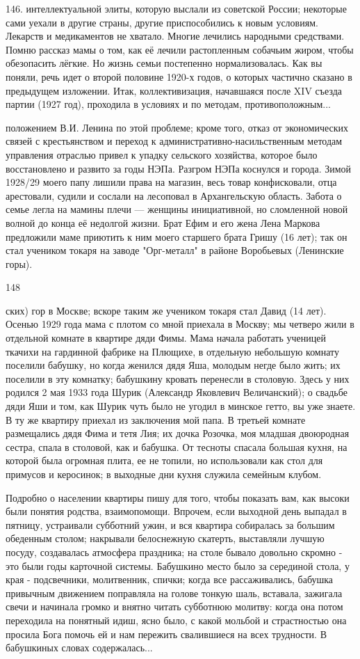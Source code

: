 146.
интеллектуальной элиты, которую выслали из советской России; некоторые сами уехали в другие страны, другие приспособились к новым условиям. Лекарств и медикаментов не хватало. Многие лечились народными средствами. Помню рассказ мамы о том, как её лечили растопленным собачьим жиром, чтобы обезопасить лёгкие. Но жизнь семьи постепенно нормализовалась. Как вы поняли, речь идет о второй половине 1920-х годов, о которых частично сказано в предыдущем изложении.
Итак, коллективизация, начавшаяся после XIV съезда партии (1927 год), проходила в условиях и по методам, противоположным...

положением В.И. Ленина по этой проблеме; кроме того, отказ от экономических связей с крестьянством и переход к административно-насильственным методам управления отраслью привел к упадку сельского хозяйства, которое было восстановлено и развито за годы НЭПа. Разгром НЭПа коснулся и города. Зимой 1928/29 моего папу лишили права на магазин, весь товар конфисковали, отца арестовали, судили и сослали на лесоповал в Архангельскую область. Забота о семье легла на мамины плечи — женщины инициативной, но сломленной новой волной до конца её недолгой жизни. Брат Ефим и его жена Лена Маркова предложили маме приютить к ним моего старшего брата Гришу (16 лет); так он стал учеником токаря на заводе "Орг-металл" в районе Воробьевых (Ленинские горы).

148

ских) гор в Москве; вскоре таким же учеником токаря стал Давид (14 лет). Осенью 1929 года мама с плотом со мной приехала в Москву; мы четверо жили в отдельной комнате в квартире дяди Фимы. Мама начала работать ученицей ткачихи на гардинной фабрике на Плющихе, в отдельную небольшую комнату поселили бабушку, но когда женился дядя Яша, молодым негде было жить; их поселили в эту комнатку; бабушкину кровать перенесли в столовую. Здесь у них родился 2 мая 1933 года Шурик (Александр Яковлевич Величанский); о свадьбе дяди Яши и том, как Шурик чуть было не угодил в минское гетто, вы уже знаете. В ту же квартиру приехал из заключения мой папа. В третьей комнате размещались дядя Фима и тетя Лия; их дочка Розочка, моя младшая двоюродная сестра, спала в столовой, как и бабушка. От тесноты спасала большая кухня, на которой была огромная плита, ее не топили, но использовали как стол для примусов и керосинок; в выходные дни кухня служила семейным клубом.

Подробно о населении квартиры пишу для того, чтобы показать вам, как высоки были понятия родства, взаимопомощи. Впрочем, если выходной день выпадал в пятницу, устраивали субботний ужин, и вся квартира собиралась за большим обеденным столом; накрывали белоснежную скатерть, выставляли лучшую посуду, создавалась атмосфера праздника; на столе бывало довольно скромно - это были годы карточной системы. Бабушкино место было за серединой стола, у края - подсвечники, молитвенник, спички; когда все рассаживались, бабушка привычным движением поправляла на голове тонкую шаль, вставала, зажигала свечи и начинала громко и внятно читать субботнюю молитву: когда она потом переходила на понятный идиш, ясно было, с какой мольбой и страстностью она просила Бога помочь ей и нам пережить свалившиеся на всех трудности. В бабушкиных словах содержалась...

